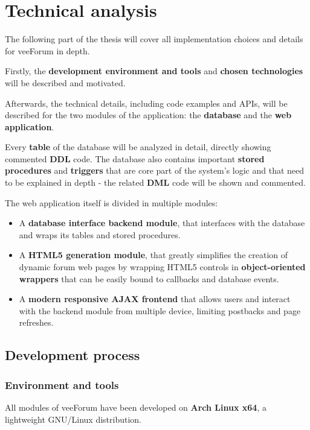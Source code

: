 \documentclass[12pt]{report}
\renewcommand\emph{\textbf}
\begin{document}
                    \newpage

    \part{Technical analysis}
        The following part of the thesis will cover all implementation choices and details for veeForum in depth.

        Firstly, the \emph{development environment and tools} and \emph{chosen technologies} will be described and motivated.

        Afterwards, the technical details, including code examples and APIs, will be described for the two modules of the application: the \emph{database} and the \emph{web application}.

        Every \emph{table} of the database will be analyzed in detail, directly showing commented \emph{DDL} code. The database also contains important \emph{stored procedures} and \emph{triggers} that are core part of the system's logic and that need to be explained in depth - the related \emph{DML} code will be shown and commented.

        The web application itself is divided in multiple modules:
        \begin{itemize}
            \item A \emph{database interface backend module}, that interfaces with the database and wraps its tables and stored procedures.
            \item A \emph{HTML5 generation module}, that greatly simplifies the creation of dynamic forum web pages by wrapping HTML5 controls in \emph{object-oriented wrappers} that can be easily bound to callbacks and database events.
            \item A \emph{modern responsive AJAX frontend} that allows users and interact with the backend module from multiple device, limiting postbacks and page refreshes.
        \end{itemize}

        \chapter{Development process}

            \section{Environment and tools}
                All modules of veeForum have been developed on \emph{Arch Linux x64}, a lightweight GNU/Linux distribution.
\end{document}

